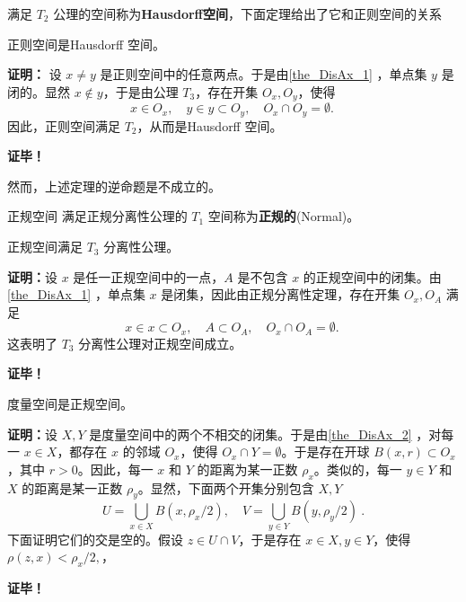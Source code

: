 满足 $T_2$ 公理的空间称为\textbf{Hausdorff空间}，下面定理给出了它和正则空间的关系
\begin{theorem}{}
正则空间是Hausdorff 空间。
\end{theorem}
\textbf{证明：}
设 $x\neq y$ 是正则空间中的任意两点。于是由\autoref{the_DisAx_1} ，单点集 $y$ 是闭的。显然 $x\notin y$，于是由公理 $T_3$，存在开集 $O_x,O_y$，使得
\begin{equation}
x\in O_x, \quad y\in y\subset O_y, \quad O_x\cap O_y=\emptyset.~
\end{equation}
因此，正则空间满足 $T_2$，从而是Hausdorff 空间。

\textbf{证毕！}

然而，上述定理的逆命题是不成立的。


\begin{definition}{正规空间}
满足正规分离性公理的 $T_1$ 空间称为\textbf{正规的}(Normal)。
\end{definition}

\begin{theorem}{}\label{the_DisAx_2}
正规空间满足 $T_3$ 分离性公理。
\end{theorem}

\textbf{证明：}设 $x$ 是任一正规空间中的一点，$A$ 是不包含 $x$ 的正规空间中的闭集。由\autoref{the_DisAx_1} ，单点集 $x$ 是闭集，因此由正规分离性定理，存在开集 $O_x,O_A$ 满足
\begin{equation}
x\in x\subset O_x, \quad A\subset O_A,\quad O_x\cap O_A=\emptyset.~ 
\end{equation}
这表明了 $T_3$ 分离性公理对正规空间成立。

\textbf{证毕！}

\begin{theorem}{}
度量空间是正规空间。
\end{theorem}

\textbf{证明：}设 $X,Y$ 是度量空间中的两个不相交的闭集。于是由\autoref{the_DisAx_2} ，对每一 $x\in X$，都存在 $x$ 的邻域 $O_x$，使得 $O_x\cap Y=\emptyset$。于是存在开球 $B(x,r)\subset O_x$，其中 $r>0$。因此，每一 $x$ 和 $Y$ 的距离为某一正数 $\rho_x$。类似的，每一 $y\in Y$ 和 $X$ 的距离是某一正数 $\rho_y$。显然，下面两个开集分别包含 $X,Y$
\begin{equation}
U=\bigcup_{x\in X} B(x,\rho_x/2),\quad V=\bigcup_{y\in Y} B(y,\rho_y/2)~.
\end{equation}
下面证明它们的交是空的。假设 $z\in U\cap V$，于是存在 $x\in X,y\in Y$，使得 $\rho(z,x)<\rho_x/2,$，


\textbf{证毕！}


